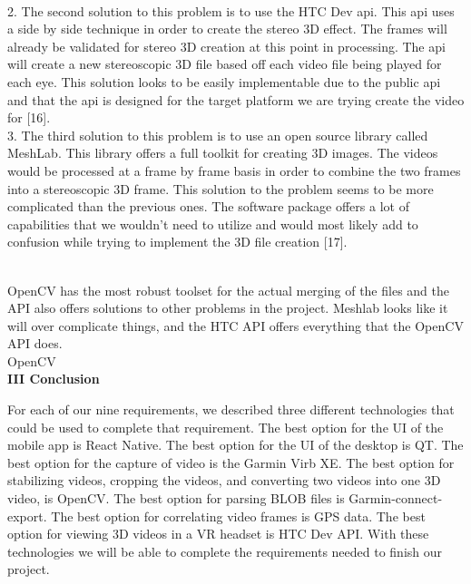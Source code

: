 \documentclass[10pt,draftclsnofoot,onecolumn]{IEEEtran}
\newcommand\tab[1][1cm]{\hspace*{#1}}
\begin{document}
\\
\tab \tab \tab 2. The second solution to this problem is to use the HTC Dev api. This api uses \newline \tab \tab \tab a side by side technique in order to create the stereo 3D effect. The frames will already be \tab \tab \tab validated for stereo 3D creation at this point in processing. The api will create a \newline \tab \tab \tab new stereoscopic 3D file based off each video file being played for each eye. This solution \tab \tab \tab looks to be easily implementable due to the public api and that the api is designed for the \tab \tab \tab target platform we are trying create the video for [16].
 \\
\tab \tab \tab 3.  The third solution to this problem is to use an open source library called MeshLab. This \tab \tab \tab library offers a full toolkit for creating 3D images. The videos would be processed at a frame \tab \tab \tab by frame basis in order to combine the two frames into a stereoscopic 3D frame. This \newline \tab \tab \tab solution to the problem seems to be more complicated than the previous ones. The software \tab \tab \tab package offers a lot of capabilities that we wouldn’t need to utilize and would most likely add \tab \tab \tab to confusion while trying to implement the 3D file creation [17].


\\
\tab \tab {\Medium\textbf{e. Discussion:  }}OpenCV has the most robust toolset for the actual merging of the files and the API \tab \tab \tab also offers solutions to other problems in the project. Meshlab looks like it will over \newline \tab \tab \tab complicate things, and the HTC API offers everything that the OpenCV API does.\\
\tab \tab {\Medium\textbf{f. Best Option:   }} OpenCV\\
\vspace{5mm}
{\Medium\textbf{III Conclusion}}\\
\vspace{5mm}

 For each of our nine requirements, we described three different technologies that could be used to complete that requirement. The best option for the UI of the mobile app is React Native. The best option for the UI of the desktop is QT. The best option for the capture of video is the Garmin Virb XE. The best option for stabilizing videos, cropping the videos, and converting two videos into one 3D video, is OpenCV. The best option for parsing BLOB files is Garmin-connect-export. The best option for correlating video frames is GPS data. The best option for viewing 3D videos in a VR headset is HTC Dev API. With these technologies we will be able to complete the requirements needed to finish our project. \\
 \vspace{5mm}
\end{document}
